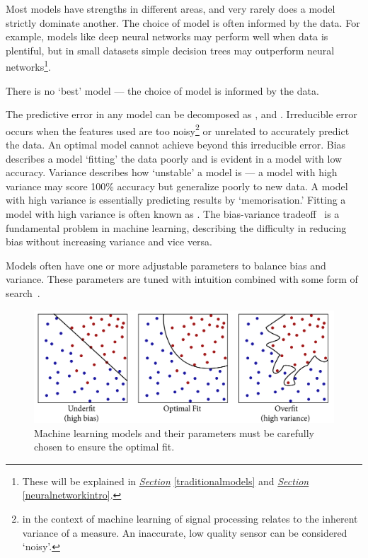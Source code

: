 \documentclass[12pt, twoside]{book}
\renewcommand\emph[1]{\textit{\color{USred}{#1}}}
\begin{document}
Most models have strengths in different areas, and very rarely does a model strictly dominate another. The choice of model is often informed by the data. For example, models like deep neural networks may perform well when data is plentiful, but in small datasets simple decision trees may outperform neural networks\footnote{These will be explained in \textit{\hyperref[traditionalmodels]{Section}} \ref{traditionalmodels} and \textit{\hyperref[neuralnetworkintro]{Section}} \ref{neuralnetworkintro}.}.



\begin{highlight}
There is no `best' model --- the choice of model is informed by the data. 
\end{highlight}

The predictive error in any model can be decomposed as \emph{irreducible error}, \emph{bias} and \emph{variance}. Irreducible error occurs when the features used are too noisy\footnote{\emph{Noisy} in the context of machine learning of signal processing relates to the inherent variance of a measure. An inaccurate, low quality sensor can be considered `noisy'.} or unrelated to accurately predict the data. An optimal model cannot achieve beyond this irreducible error. Bias describes a model `fitting' the data poorly and is evident in a model with low accuracy. Variance describes how `unstable' a model is --- a model with high variance may score 100\% accuracy but generalize poorly to new data. A model with high variance is essentially predicting results by `memorisation.' Fitting a model with high variance is often known as \emph{overfitting}. The bias-variance tradeoff~\cite{biasvarnn} is a fundamental problem in machine learning, describing the difficulty in reducing bias without increasing variance and vice versa. 

Models often have one or more adjustable parameters to balance bias and variance. These parameters are tuned with intuition combined with some form of search~\cite{gridsearch, tpe}. 

\begin{figure}[h]
\label{overfitex}
\centering\includegraphics[width=1\linewidth]{overfit2.png}
\caption{Machine learning models and their parameters must be carefully chosen to ensure the optimal fit.}
\end{figure}
\end{document}
